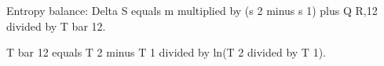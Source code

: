 Entropy balance:  
Delta S equals m multiplied by (s 2 minus s 1) plus Q R,12 divided by T bar 12.  

T bar 12 equals T 2 minus T 1 divided by ln(T 2 divided by T 1).